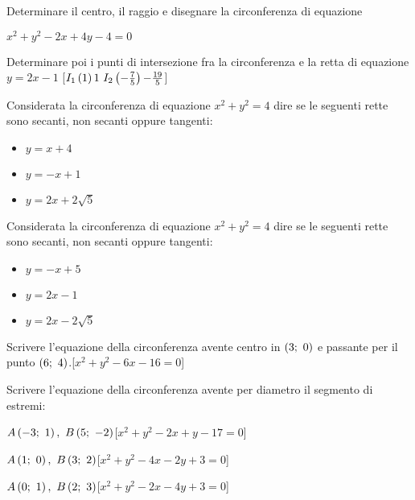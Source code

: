 \begin{esercizio}\label{ese:}
Determinare il centro, il raggio e disegnare la circonferenza di equazione

\(x^2+y^2-2x+4y-4=0\)

Determinare poi i punti di intersezione fra la circonferenza e la retta di 
equazione \(y=2x-1\) 
\hfill [\(I_1\left( 1 \right){1}~I_2\left( -\frac{7}{5} \right){-\frac{19}{5}}\)]
\end{esercizio}

\begin{esercizio}\label{ese:}
Considerata la circonferenza di equazione \(x^2 +y^2 = 4\) dire se le seguenti 
rette sono secanti, non secanti oppure tangenti:
\begin{itemize} [nosep]
 \item \(y=x+4\)
 \item \(y=-x+1\)
 \item \(y=2x+2\sqrt{5}\)
\end{itemize}
\end{esercizio}

\begin{esercizio}\label{ese:}
Considerata la circonferenza di equazione \(x^2 +y^2 = 4\) dire se le seguenti 
rette sono secanti, non secanti oppure tangenti:
\begin{itemize} [nosep]
 \item \(y=-x+5\)
 \item \(y=2x-1\)
 \item \(y=2x-2\sqrt{5}\)
\end{itemize}
\end{esercizio}

\begin{esercizio}\label{ese:}
Scrivere l'equazione della circonferenza avente centro in \(\left( 3;~0 \right)\) e 
passante per il punto \(\left( 6;~4 \right)\).\hfill[\(x^2+y^2-6x-16=0\)]
\end{esercizio}

\begin{esercizio}\label{ese:}
Scrivere l'equazione della circonferenza avente per diametro il segmento di 
estremi:
 \begin{enumeratea}
  \item  \(A\left( -3;~1 \right),~B\left( 5;~-2 \right)\)\hfill [\(x^2+y^2-2x+y-17=0\)]
  \item  \(A\left( 1;~0 \right),~B\left( 3;~2 \right)\)\hfill [\(x^2+y^2-4x-2y+3=0\)]
  \item  \(A\left( 0;~1 \right),~B\left( 2;~3 \right)\)\hfill [\(x^2+y^2-2x-4y+3=0\)]
 \end{enumeratea}
\end{esercizio}

